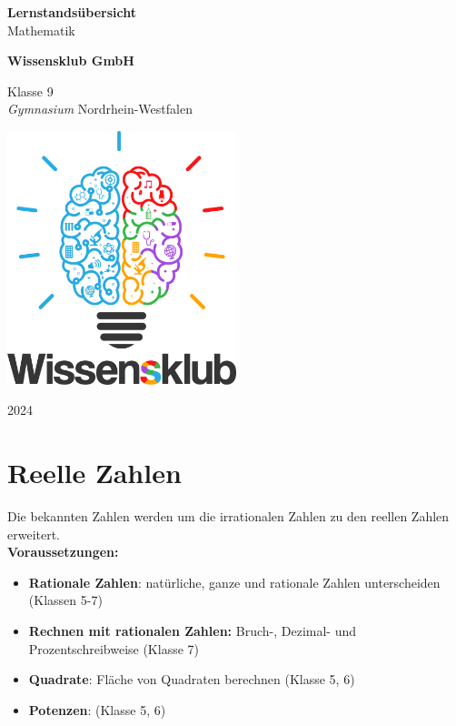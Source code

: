 \documentclass{article}
\begin{document}
\begin{titlepage}
    \begin{center}
        \vspace*{1cm}
            
        \Huge
        \textbf{Lernstandsübersicht}\\            
        \vspace{0.5cm}
        \LARGE
        Mathematik
            
        \vspace{1.5cm}
            
        \textbf{Wissensklub GmbH}
            
        \vfill
            
        Klasse 9\\
        \textit{Gymnasium} Nordrhein-Westfalen
            
        \vspace{0.8cm}
            
        \includegraphics[width=0.5\textwidth]{Wissensklub-Logo.png}
            
        \Large
        2024          
    \end{center}
\end{titlepage}

\section{Reelle Zahlen}
Die bekannten Zahlen werden um die irrationalen Zahlen zu den reellen Zahlen erweitert.\\
\textbf{Voraussetzungen:}
\begin{itemize}
    \item \textbf{Rationale Zahlen}: natürliche, ganze und rationale Zahlen unterscheiden (Klassen 5-7)
    \item \textbf{Rechnen mit rationalen Zahlen:} Bruch-, Dezimal- und Prozentschreibweise (Klasse 7)
    \item \textbf{Quadrate}: Fläche von Quadraten berechnen (Klasse 5, 6)
    \item \textbf{Potenzen}: (Klasse 5, 6)
\end{itemize}
\end{document}
